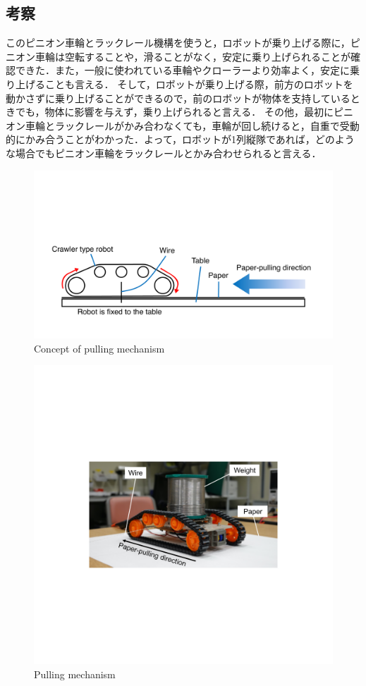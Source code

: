 \subsection{考察}
このピニオン車輪とラックレール機構を使うと，ロボットが乗り上げる際に，ピニオン車輪は空転することや，滑ることがなく，安定に乗り上げられることが確認できた．また，一般に使われている車輪やクローラーより効率よく，安定に乗り上げることも言える．
そして，ロボットが乗り上げる際，前方のロボットを動かさずに乗り上げることができるので，前のロボットが物体を支持しているときでも，物体に影響を与えず，乗り上げられると言える．
その他，最初にピニオン車輪とラックレールがかみ合わなくても，車輪が回し続けると，自重で受動的にかみ合うことがわかった．よって，ロボットが1列縦隊であれば，どのような場合でもピニオン車輪をラックレールとかみ合わせられると言える．

\begin{figure}[tb]
  \centering
  \includegraphics[width=0.75\columnwidth]{figure/concept-pulling-mechanism.pdf}
  \caption{Concept of pulling mechanism}
  \label{fig:pulling-mechanism-concept}
\end{figure}

\begin{figure}[tb]
  \centering
  \includegraphics[width=0.6\columnwidth]{figure/pulling-mechanism.pdf}
  \caption{Pulling mechanism}
  \label{fig:pulling-mechanism}
\end{figure}

